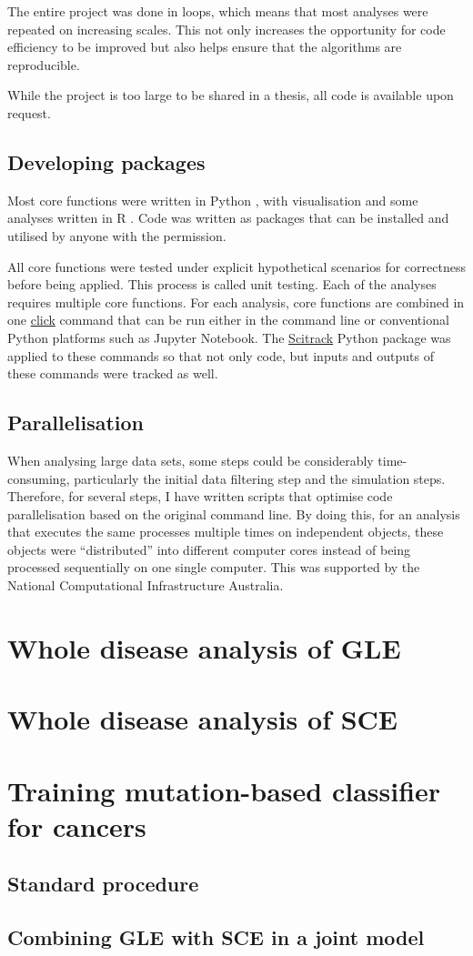 The entire project was done in loops, which means that most analyses were repeated on increasing scales. This not only increases the opportunity for code efficiency to be improved but also helps ensure that the algorithms are reproducible. 

While the project is too large to be shared in a thesis, all code is available upon request. 

\subsection{Developing packages}
Most core functions were written in Python \citep{van1995python}, with visualisation and some analyses written in R \citep{r}. Code was written as packages that can be installed and utilised by anyone with the permission. 

All core functions were tested under explicit hypothetical scenarios for correctness before being applied. This process is called unit testing. Each of the analyses requires multiple core functions. For each analysis, core functions are combined in one \href{https://click.palletsprojects.com/en/8.0.x/}{click} command that can be run either in the command line or conventional Python platforms such as Jupyter Notebook. The \href{https://github.com/HuttleyLab/scitrack}{Scitrack} Python package was applied to these commands so that not only code, but inputs and outputs of these commands were tracked as well.

\subsection{Parallelisation}
When analysing large data sets, some steps could be considerably time-consuming, particularly the initial data filtering step and the simulation steps. Therefore, for several steps, I have written scripts that optimise code parallelisation based on the original command line. By doing this, for an analysis that executes the same processes multiple times on independent objects, these objects were ``distributed'' into different computer cores instead of being processed sequentially on one single computer. This was supported by the National Computational Infrastructure Australia.


\section{Whole disease analysis of GLE}
\section{Whole disease analysis of SCE}
\section{Training mutation-based classifier for cancers}
\subsection{Standard procedure}
\label{methods:ml}
\subsection{Combining GLE with SCE in a joint model}
